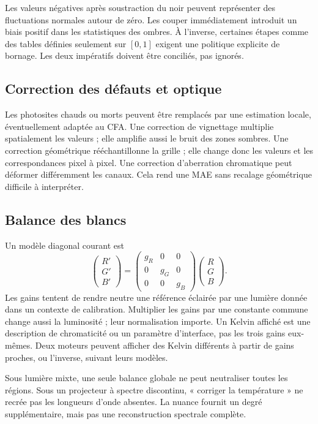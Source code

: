 Les valeurs négatives après soustraction du noir peuvent
représenter des fluctuations normales autour de zéro.
Les couper immédiatement introduit un biais positif dans
les statistiques des ombres. À l'inverse, certaines étapes
comme des tables définies seulement sur $[0,1]$ exigent une
politique explicite de bornage. Les deux impératifs doivent
être conciliés, pas ignorés.

\subsection{Correction des défauts et optique}
Les photosites chauds ou morts peuvent être remplacés par
une estimation locale, éventuellement adaptée au CFA.
Une correction de vignettage multiplie spatialement les
valeurs ; elle amplifie aussi le bruit des zones sombres.
Une correction géométrique rééchantillonne la grille ; elle
change donc les valeurs et les correspondances pixel à pixel.
Une correction d'aberration chromatique peut déformer
différemment les canaux. Cela rend une MAE sans recalage
géométrique difficile à interpréter.

\subsection{Balance des blancs}
Un modèle diagonal courant est
\begin{equation}
\begin{pmatrix}R'\\G'\\B'\end{pmatrix}=
\begin{pmatrix}g_R&0&0\\0&g_G&0\\0&0&g_B\end{pmatrix}
\begin{pmatrix}R\\G\\B\end{pmatrix}.
\end{equation}
Les gains tentent de rendre neutre une référence éclairée
par une lumière donnée dans un contexte de calibration.
Multiplier les gains par une constante commune change
aussi la luminosité ; leur normalisation importe.
Un Kelvin affiché est une description de chromaticité ou
un paramètre d'interface, pas les trois gains eux-mêmes.
Deux moteurs peuvent afficher des Kelvin différents à
partir de gains proches, ou l'inverse, suivant leurs modèles.

Sous lumière mixte, une seule balance globale ne peut
neutraliser toutes les régions. Sous un projecteur à spectre
discontinu, « corriger la température » ne recrée pas les
longueurs d'onde absentes. La nuance fournit un degré
supplémentaire, mais pas une reconstruction spectrale complète.

